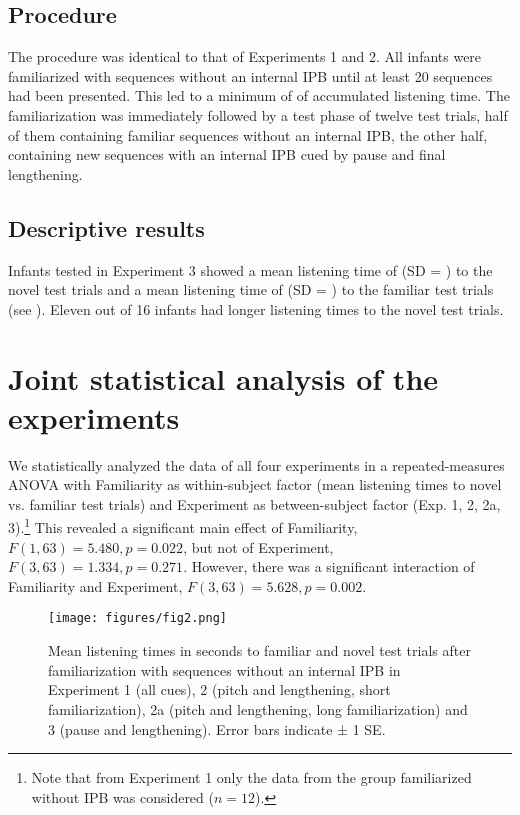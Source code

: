 \documentclass[output=paper]{langscibook}
\begin{document}
\subsection{Procedure}
The procedure was identical to that of Experiments 1 and 2. All infants were familiarized with sequences without an internal IPB until at least 20 sequences had been presented. This led to a minimum of  of accumulated listening time. The familiarization was immediately followed by a test phase of twelve test trials, half of them containing familiar sequences without an internal IPB, the other half, containing new sequences with an internal IPB cued by pause and final lengthening.

\subsection{Descriptive results}
Infants tested in Experiment 3 showed a mean listening time of  (SD = ) to the novel test trials and a mean listening time of  (SD = ) to the familiar test trials (see ). Eleven out of 16 infants had longer listening times to the novel test trials.


\section{Joint statistical analysis of the experiments}\largerpage

We statistically analyzed the data of all four experiments in a repeated-measures ANOVA with Familiarity as within-subject factor (mean listening times to novel vs. familiar test trials) and Experiment as between-subject factor (Exp. 1, 2, 2a, 3).\footnote{Note that from Experiment 1 only the data from the group familiarized without IPB was considered ($n=12$).} This revealed a significant main effect of Familiarity, $F(1,63) = 5.480,\allowbreak p = 0.022$, but not of Experiment, $F(3,63) = 1.334,\allowbreak p = 0.271$. However, there was a significant interaction of Familiarity and Experiment, $F(3,63) = 5.628,\allowbreak p = 0.002$.\largerpage

\begin{figure}
\texttt{[image: figures/fig2.png]}
\caption{Mean listening times in seconds to familiar and novel test trials after familiarization with sequences without an internal IPB in Experiment 1 (all cues), 2 (pitch and lengthening, short familiarization), 2a (pitch and lengthening, long familiarization) and 3 (pause and lengthening). Error bars indicate ± 1 SE.}
 \label{fig2}
\end{figure}
\end{document}
